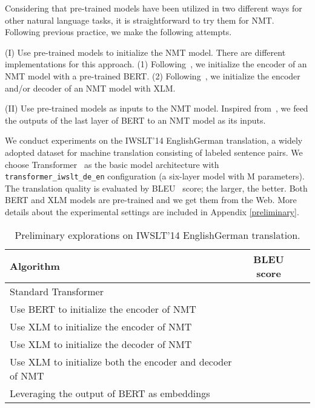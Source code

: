 \documentclass{article} \usepackage{iclr2020_conference,times}
\begin{document}
Considering that pre-trained models have been utilized in two different ways for other natural language tasks, it is straightforward to try them for NMT. Following previous practice, we make the following attempts.

\noindent(I) Use pre-trained models to initialize the NMT model. There are different implementations for this approach. (1) Following~\citep{devlin2018bert}, we initialize the encoder of an NMT model with a pre-trained BERT. (2) Following~\citep{lample2019cross}, we initialize the encoder and/or decoder of an NMT model with XLM. 

\noindent(II) Use pre-trained models as inputs to the NMT model. Inspired from~\citep{peters2018deep}, we feed the outputs of the last layer of BERT to an NMT model as its inputs.

We conduct experiments on the IWSLT'14 EnglishGerman translation, a widely adopted dataset for machine translation consisting of  labeled sentence pairs. We choose Transformer~\citep{vaswani2017attention} as the basic model architecture with \texttt{transformer\_iwslt\_de\_en} configuration (a six-layer model with M parameters). The translation quality is evaluated by BLEU~\citep{papineni2002bleu} score; the larger, the better. Both BERT and XLM models are pre-trained and we get them from the Web. More details about the experimental settings are included in Appendix \ref{preliminary}.

\begin{table}[!htbp]
    \small
	\centering
	\caption{Preliminary explorations on IWSLT'14 EnglishGerman translation.}
	\begin{tabular}{lcc}
		\toprule
		Algorithm & BLEU score  \\
		\midrule
		Standard Transformer  &   \\
		\midrule
		Use BERT to initialize the encoder of NMT &  \\
		Use XLM to initialize the encoder of NMT &   \\
		Use XLM to initialize the decoder of NMT &   \\
		Use XLM to initialize both the encoder and decoder of NMT &  \\
		\midrule
		Leveraging the output of BERT as embeddings &  \\
		\bottomrule
	\end{tabular}
	\label{tab:results_iwslt_first_explore}
\end{table}
\end{document}
